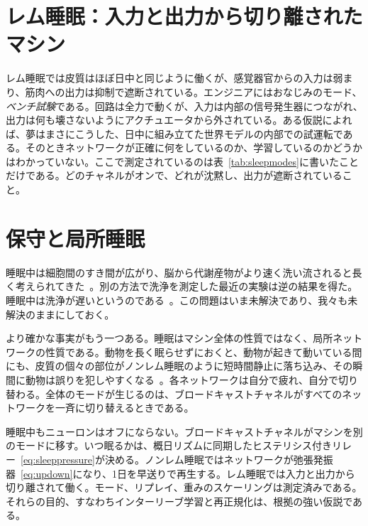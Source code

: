 \section{レム睡眠：入力と出力から切り離されたマシン}

レム睡眠では皮質はほぼ日中と同じように働くが、感覚器官からの入力は弱まり、筋肉への出力は抑制で遮断されている。エンジニアにはおなじみのモード、\emph{ベンチ試験}である。回路は全力で動くが、入力は内部の信号発生器につながれ、出力は何も壊さないようにアクチュエータから外されている。ある仮説によれば、夢はまさにこうした、日中に組み立てた世界モデルの内部での試運転である。そのときネットワークが正確に何をしているのか、学習しているのかどうかはわかっていない。ここで測定されているのは表~\ref{tab:sleepmodes}に書いたことだけである。どのチャネルがオンで、どれが沈黙し、出力が遮断されていること。

\section{保守と局所睡眠}

睡眠中は細胞間のすき間が広がり、脳から代謝産物がより速く洗い流されると長く考えられてきた~\cite{Xie2013}。別の方法で洗浄を測定した最近の実験は逆の結果を得た。睡眠中は洗浄が遅いというのである~\cite{Miao2024}。この問題はいま未解決であり、我々も未解決のままにしておく。

より確かな事実がもう一つある。睡眠はマシン全体の性質ではなく、局所ネットワークの性質である。動物を長く眠らせずにおくと、動物が起きて動いている間にも、皮質の個々の部位がノンレム睡眠のように短時間静止に落ち込み、その瞬間に動物は誤りを犯しやすくなる~\cite{Vyazovskiy2011}。各ネットワークは自分で疲れ、自分で切り替わる。全体のモードが生じるのは、ブロードキャストチャネルがすべてのネットワークを一斉に切り替えるときである。

\begin{keyblock}
\begin{proposition}[モードの集まりとしての睡眠]
\label{prop:sleep}
睡眠中もニューロンはオフにならない。ブロードキャストチャネルがマシンを別のモードに移す。いつ眠るかは、概日リズムに同期したヒステリシス付きリレー~\eqref{eq:sleeppressure}が決める。ノンレム睡眠ではネットワークが弛張発振器~\eqref{eq:updown}になり、1日を早送りで再生する。レム睡眠では入力と出力から切り離されて働く。モード、リプレイ、重みのスケーリングは測定済みである。それらの目的、すなわちインターリーブ学習と再正規化は、根拠の強い仮説である。
\end{proposition}
\end{keyblock}

